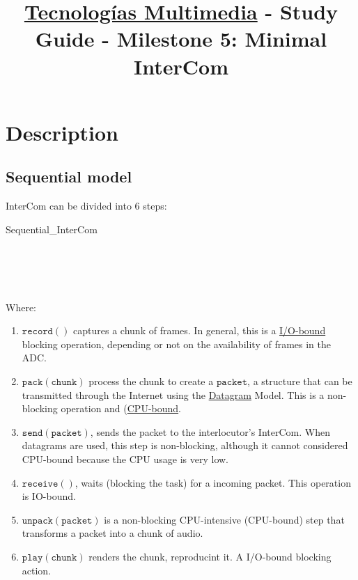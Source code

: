 \title{\href{https://www.ual.es/estudios/grados/presentacion/plandeestudios/asignatura/4015/40154321?idioma=zh_CN}{Tecnologías Multimedia} - Study Guide - Milestone 5: Minimal InterCom}

\maketitle

\section{Description}

\subsection{Sequential model}

InterCom can be divided into 6 steps:

\begin{pseudocode}{Sequential\_InterCom}{~}
  \BEGIN
     \GETS {}\\
     \GETS {}\\
    \\
     \GETS {}\\
     \GETS {}\\
  \END
\end{pseudocode}

Where:

\begin{enumerate}
\item $\mathtt{record()}$ captures a chunk of frames. In general, this
  is a \href{https://en.wikipedia.org/wiki/I/O_bound}{I/O-bound}
  blocking operation, depending or not on the availability of frames
  in the ADC.
\item $\mathtt{pack(chunk)}$ process the chunk to create a
  $\mathtt{packet}$, a structure that can be transmitted through the
  Internet using the
  \href{https://en.wikipedia.org/wiki/Datagram}{Datagram} Model. This
  is a non-blocking operation and
  (\href{https://en.wikipedia.org/wiki/CPU-bound}{CPU-bound}.
\item $\mathtt{send(packet)}$, sends the packet to the
  interlocutor's InterCom. When datagrams are used, this step is
  non-blocking, although it cannot considered CPU-bound because the
  CPU usage is very low.
\item $\mathtt{receive()}$, waits (blocking the task) for a incoming
  packet. This operation is IO-bound.
\item $\mathtt{unpack(packet)}$ is a non-blocking
  CPU-intensive (CPU-bound) step that transforms a packet into a chunk
  of audio.
\item $\mathtt{play(chunk)}$ renders the chunk, reproducint it. A
  I/O-bound blocking action.
\end{enumerate}
  

